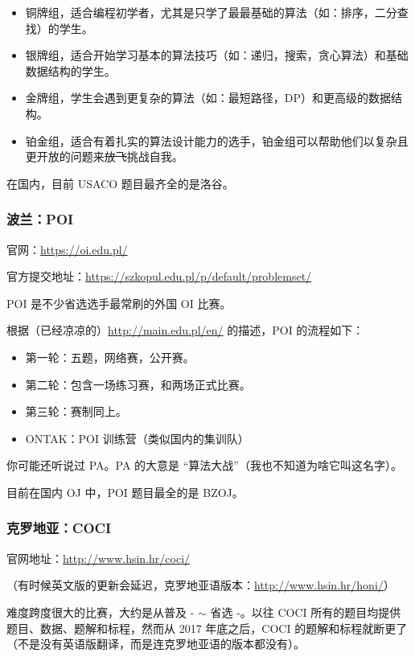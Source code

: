 \begin{itemize}
\item 铜牌组，适合编程初学者，尤其是只学了最最基础的算法（如：排序，二分查找）的学生。
\item 银牌组，适合开始学习基本的算法技巧（如：递归，搜索，贪心算法）和基础数据结构的学生。
\item 金牌组，学生会遇到更复杂的算法（如：最短路径，DP）和更高级的数据结构。
\item 铂金组，适合有着扎实的算法设计能力的选手，铂金组可以帮助他们以复杂且更开放的问题来\sout{放飞}挑战自我。
\end{itemize}

在国内，目前 USACO 题目最齐全的是洛谷。

\subsubsection{波兰：POI}

官网：\url{https://oi.edu.pl/}  

官方提交地址：\url{https://szkopul.edu.pl/p/default/problemset/}  

POI 是不少省选选手最常刷的外国 OI 比赛。  

根据（已经凉凉的）\url{http://main.edu.pl/en/} 的描述，POI 的流程如下：  

\begin{itemize}
\item 第一轮：五题，网络赛，公开赛。
\item 第二轮：包含一场练习赛，和两场正式比赛。
\item 第三轮：赛制同上。
\item ONTAK：POI 训练营（类似国内的集训队）
\end{itemize}

你可能还听说过 PA。PA 的大意是 “算法大战”（我也不知道为啥它叫这名字）。

目前在国内 OJ 中，POI 题目最全的是 BZOJ。

\subsubsection{克罗地亚：COCI}

官网地址：\url{http://www.hsin.hr/coci/}  

（有时候英文版的更新会延迟，克罗地亚语版本：\url{http://www.hsin.hr/honi/}）

难度跨度很大的比赛，大约是从普及 - $\sim$ 省选 -。以往 COCI 所有的题目均提供题目、数据、题解和标程，然而从 2017 年底之后，COCI 的题解和标程就断更了（不是没有英语版翻译，而是连克罗地亚语的版本都没有）。

